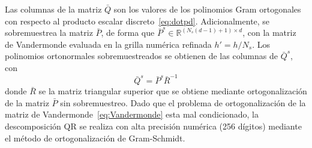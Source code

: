 Las columnas de la matriz $\bar{Q}$ son los valores de los polinomios Gram ortogonales 
con respecto al producto escalar discreto~\eqref{eq:dotpd}.
Adicionalmente, se sobremuestrea la matriz $\bar{P}$, de forma que 
$\bar{P}^s \in \mathbb{R}^{(N_s(d-1)+1)\times d}$, 
con la matriz de Vandermonde evaluada en la grilla numérica refinada $h'=h/N_s$. 
Los polinomios 
ortonormales sobremuestreados se obtienen de las columnas de $\bar{Q}^s$, con 
\begin{equation}
\bar{Q}^s=\bar{P}^s \bar{R}^{-1}
\label{eq:qsob}
\end{equation}
donde $\bar{R}$ se la matriz triangular superior que se obtiene 
mediante ortogonalización de la matriz $\bar{P}$ sin sobremuestreo. Dado 
que el problema de ortogonalización de la matriz de Vandermonde~\eqref{eq:Vandermonde} 
esta mal condicionado, la descomposición QR se realiza con alta precisión 
numérica (256 dígitos) mediante el método de ortogonalización de Gram-Schmidt.

